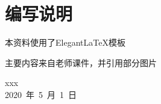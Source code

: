 \chapter*{编写说明}




本资料使用了Elegant\LaTeX 模板

主要内容来自老师课件，并引用部分图片

\vskip 1.5cm

\begin{flushright}
	xxx\\
	2020\ 年\ 5\ 月\ 1\ 日
\end{flushright}